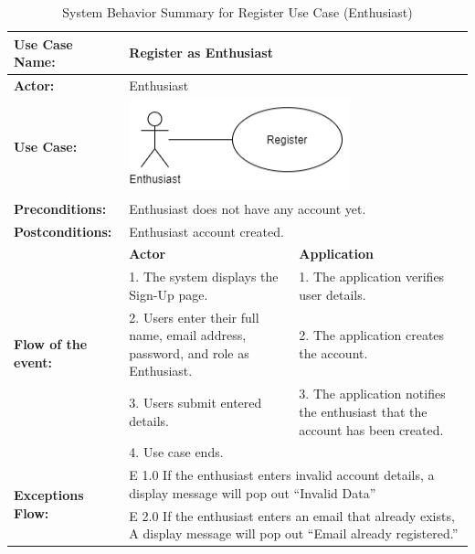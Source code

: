 \begin{longtable}{|p{3cm}|p{5cm}|p{5cm}|}
    \caption{System Behavior Summary for Register Use Case (Enthusiast)} \\
    \hline
    \textbf{Use Case Name:} & \multicolumn{2}{l|}{Register as Enthusiast} \\ \hline
    \textbf{Actor:} & \multicolumn{2}{l|}{Enthusiast} \\ \hline
    \textbf{Use Case:} & \multicolumn{2}{l|}{\includegraphics[width=0.5\linewidth]{mainmatter/images/sucd7.png}} \\ \hline
    \textbf{Preconditions:} & \multicolumn{2}{p{10cm}|}{Enthusiast does not have any account yet.} \\ \hline
    \textbf{Postconditions:} & \multicolumn{2}{p{10cm}|}{Enthusiast account created.} \\ \hline
    \multirow{5}{3cm}{\raggedright \textbf{Flow of the event:}} & \textbf{Actor} & \textbf{Application} \\ \cline{2-3}
    & 1. The system displays the Sign-Up page. & 1. The application verifies user details. \\ \cline{2-3}
    & 2. Users enter their full name, email address, password, and role as Enthusiast. & 2. The application creates the account.  \\ \cline{2-3}
    & 3. Users submit entered details. & 3. The application notifies the enthusiast that the account has been created.  \\ \cline{2-3}
    & 4. Use case ends. &  \\ \hline
    \multirow{2}{3cm}{\raggedright \textbf{Exceptions Flow:}} 
    & \multicolumn{2}{p{10cm}|}{\raggedright E 1.0 If the enthusiast enters invalid account details, a display message will pop out “Invalid Data”} \\ \cline{2-3}
    & \multicolumn{2}{p{10cm}|}{\raggedright E 2.0 If the enthusiast enters an email that already exists, A display message will pop out “Email already registered.”} \\ \hline
\end{longtable}
\pagebreak

